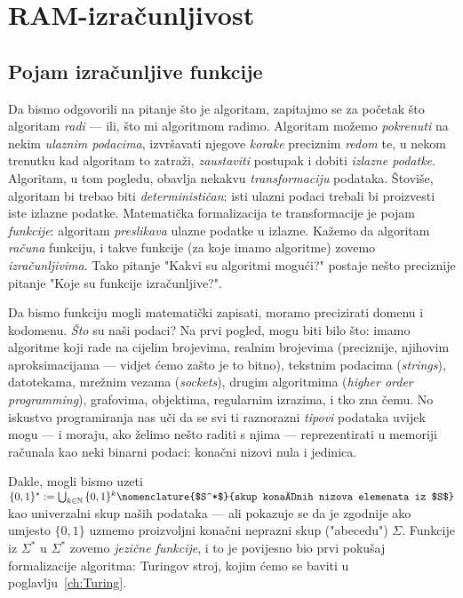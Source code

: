 \chapter{RAM-izračunljivost}

\section{Pojam izračunljive funkcije}

Da bismo odgovorili na pitanje što je algoritam, zapitajmo se za početak što algoritam \emph{radi}  --- ili, što mi algoritmom radimo. Algoritam možemo \emph{pokrenuti} na nekim \emph{ulaznim podacima}, izvršavati njegove \emph{korake} preciznim \emph{redom} te, u nekom trenutku kad algoritam to zatraži, \emph{zaustaviti} postupak i dobiti \emph{izlazne podatke}. Algoritam, u tom pogledu, obavlja nekakvu \emph{transformaciju} podataka. Štoviše, algoritam bi trebao biti \emph{determinističan}: isti ulazni podaci trebali bi proizvesti iste izlazne podatke. Matematička formalizacija te transformacije je pojam \emph{funkcije}: algoritam \emph{preslikava} ulazne podatke u izlazne. Kažemo da algoritam \emph{računa} funkciju, i takve funkcije (za koje imamo algoritme) zovemo \emph{izračunljivima}. Tako pitanje "Kakvi su algoritmi mogući?" postaje nešto preciznije pitanje "Koje su funkcije izračunljive?".


Da bismo funkciju mogli matematički zapisati, moramo precizirati domenu i kodomenu. \emph{Što} su naši podaci?
Na prvi pogled, mogu biti bilo što: imamo algoritme koji rade na cijelim brojevima, realnim brojevima (preciznije, njihovim aproksimacijama --- vidjet ćemo zašto je to bitno), tekstnim podacima (\emph{strings}), datotekama, mrežnim vezama (\emph{sockets}), drugim algoritmima (\emph{higher order programming}), grafovima, objektima, regularnim izrazima, i tko zna čemu. No iskustvo programiranja nas uči da se svi ti raznorazni \emph{tipovi} podataka uvijek mogu --- i moraju, ako želimo nešto raditi s njima --- reprezentirati u memoriji računala kao neki binarni podaci: konačni nizovi nula i jedinica.

Dakle, mogli bismo uzeti $\{0,1\}^*:=\bigcup_{k\in\mathbb N}\,\{0,1\}^k\nomenclature{$S^*$}{skup konačnih nizova elemenata iz $S$}$ kao univerzalni skup naših podataka --- ali pokazuje se da je zgodnije ako umjesto $\{0,1\}$ uzmemo proizvoljni konačni neprazni skup ("abecedu") $\Sigma$. Funkcije iz $\Sigma^*$ u $\Sigma^*$ zovemo \emph{jezične funkcije}, i to je povijesno bio prvi pokušaj formalizacije algoritma: Turingov stroj, kojim ćemo se baviti u poglavlju~\ref{ch:Turing}.

